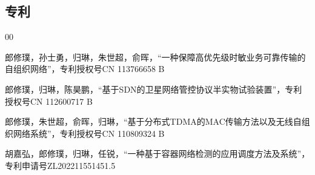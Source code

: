 \begin{achievements}
\subsection*{专利}
\begin{bibliolist}{00}
  \item 郎修璞，孙士勇，归琳，朱世超，俞晖，``一种保障高优先级时敏业务可靠传输的自组织网络''，专利授权号CN 113766658 B
  \item 郎修璞，归琳，陈昊鹏，``基于SDN的卫星网络管控协议半实物试验装置''，专利授权号CN 112600717 B
  \item 郎修璞，朱世超，俞晖，归琳，``基于分布式TDMA的MAC传输方法以及无线自组织网络系统''，专利授权号CN 110809324 B
  \item 胡嘉弘，郎修璞，归琳，任锐，``一种基于容器网络检测的应用调度方法及系统''，专利申请号ZL202211551451.5
  
\end{bibliolist}

\end{achievements}
